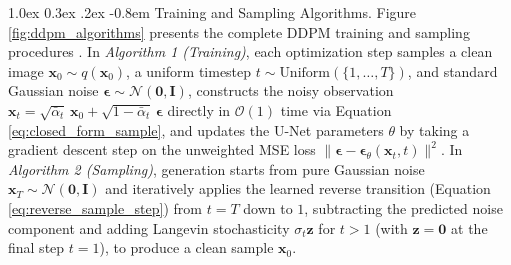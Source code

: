 \documentclass[10pt,a4paper]{article}
\makeatletter
\renewcommand\paragraph{\@startsection{paragraph}{4}{\z@}%
                                    {1.0ex \@plus 0.3ex \@minus .2ex}%
                                    {-0.8em}%
                                    {\normalfont\normalsize\bfseries}}
\makeatother
\begin{document}
\paragraph{Training and Sampling Algorithms.}
Figure \ref{fig:ddpm_algorithms} presents the complete DDPM training and sampling procedures \cite{ho2020denoising}. In \textit{Algorithm 1 (Training)}, each optimization step samples a clean image $\mathbf{x}_0 \sim q(\mathbf{x}_0)$, a uniform timestep $t \sim \text{Uniform}(\{1, \dots, T\})$, and standard Gaussian noise $\bm{\epsilon} \sim \mathcal{N}(\mathbf{0}, \mathbf{I})$, constructs the noisy observation $\mathbf{x}_t = \sqrt{\bar{\alpha}_t}\,\mathbf{x}_0 + \sqrt{1 - \bar{\alpha}_t}\,\bm{\epsilon}$ directly in $\mathcal{O}(1)$ time via Equation \eqref{eq:closed_form_sample}, and updates the U-Net parameters $\theta$ by taking a gradient descent step on the unweighted MSE loss $\big\|\bm{\epsilon} - \bm{\epsilon}_\theta(\mathbf{x}_t, t)\big\|^2$. In \textit{Algorithm 2 (Sampling)}, generation starts from pure Gaussian noise $\mathbf{x}_T \sim \mathcal{N}(\mathbf{0}, \mathbf{I})$ and iteratively applies the learned reverse transition (Equation \eqref{eq:reverse_sample_step}) from $t = T$ down to $1$, subtracting the predicted noise component and adding Langevin stochasticity $\sigma_t \mathbf{z}$ for $t > 1$ (with $\mathbf{z} = \mathbf{0}$ at the final step $t = 1$), to produce a clean sample $\mathbf{x}_0$.
\end{document}

